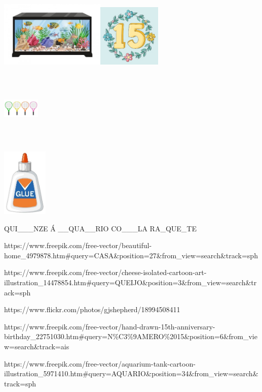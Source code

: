 \includegraphics[width=1.98343in,height=1.24038in]{media/image30.jpeg}\includegraphics[width=1.18269in,height=1.18269in]{media/image31.jpeg}

\includegraphics[width=0.70192in,height=1.39623in]{media/image32.jpeg}

\includegraphics[width=0.85819in,height=1.27885in]{media/image33.jpeg}

QUI\_\_\_NZE Á \_\_QUA\_\_RIO CO\_\_\_LA RA\_QUE\_TE

https://www.freepik.com/free-vector/beautiful-home\_4979878.htm\#query=CASA\&position=27\&from\_view=search\&track=sph

https://www.freepik.com/free-vector/cheese-isolated-cartoon-art-illustration\_14478854.htm\#query=QUEIJO\&position=3\&from\_view=search\&track=sph

https://www.flickr.com/photos/gjshepherd/18994508411

https://www.freepik.com/free-vector/hand-drawn-15th-anniversary-birthday\_22751030.htm\#query=N\%C3\%9AMERO\%2015\&position=6\&from\_view=search\&track=ais

https://www.freepik.com/free-vector/aquarium-tank-cartoon-illustration\_5971410.htm\#query=AQUARIO\&position=34\&from\_view=search\&track=sph

